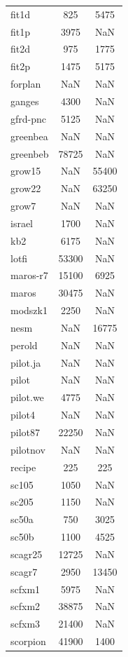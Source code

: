 \begin{longtable}{lcc}
fit1d    &      825 &  5475 \\
fit1p    &     3975 &   NaN \\
fit2d    &      975 &  1775 \\
fit2p    &     1475 &  5175 \\
forplan  &      NaN &   NaN \\
ganges   &     4300 &   NaN \\
gfrd-pnc &     5125 &   NaN \\
greenbea &      NaN &   NaN \\
greenbeb &    78725 &   NaN \\
grow15   &      NaN & 55400 \\
grow22   &      NaN & 63250 \\
grow7    &      NaN &   NaN \\
israel   &     1700 &   NaN \\
kb2      &     6175 &   NaN \\
lotfi    &    53300 &   NaN \\
maros-r7 &    15100 &  6925 \\
maros    &    30475 &   NaN \\
modszk1  &     2250 &   NaN \\
nesm     &      NaN & 16775 \\
perold   &      NaN &   NaN \\
pilot.ja &      NaN &   NaN \\
pilot    &      NaN &   NaN \\
pilot.we &     4775 &   NaN \\
pilot4   &      NaN &   NaN \\
pilot87  &    22250 &   NaN \\
pilotnov &      NaN &   NaN \\
recipe   &      225 &   225 \\
sc105    &     1050 &   NaN \\
sc205    &     1150 &   NaN \\
sc50a    &      750 &  3025 \\
sc50b    &     1100 &  4525 \\
scagr25  &    12725 &   NaN \\
scagr7   &     2950 & 13450 \\
scfxm1   &     5975 &   NaN \\
scfxm2   &    38875 &   NaN \\
scfxm3   &    21400 &   NaN \\
scorpion &    41900 &  1400 \\

\end{longtable}
